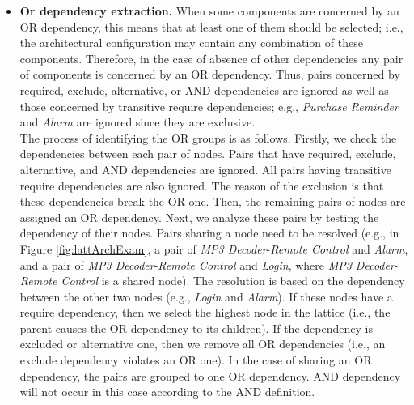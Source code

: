 \documentclass[graybox]{svmult}
\begin{document}
\begin{itemize}
\item \textbf{Or dependency extraction.}  {When some components are concerned by an OR dependency, this means that at least one of them should be selected; i.e., the architectural configuration may contain any combination of these components. Therefore, in the case of absence of other dependencies any pair of components is concerned by an OR dependency. Thus, pairs concerned by required, exclude, alternative, or AND dependencies are ignored as well as those concerned by transitive require dependencies; e.g., \textit{Purchase Reminder} and \textit{Alarm} are ignored since they are exclusive.\\
The process of identifying the OR groups is as follows. Firstly, we check the dependencies between each pair of nodes. Pairs that have required, exclude, alternative, and AND dependencies are ignored. All pairs having transitive require dependencies are also ignored. The reason of the exclusion is that these dependencies break the OR one. Then, the remaining pairs of nodes are assigned an OR dependency. Next, we analyze these pairs by testing the dependency of their nodes. Pairs sharing a node need to be resolved (e.g., in Figure \ref{fig:lattArchExam}, a pair of \textit{MP3 Decoder}-\textit{Remote Control} and \textit{Alarm}, and a pair of \textit{MP3 Decoder}-\textit{Remote Control} and \textit{Login}, where \textit{MP3 Decoder}-\textit{Remote Control} is a shared node). The resolution is based on the dependency between the other two nodes (e.g., \textit{Login} and \textit{Alarm}). If these nodes have a require dependency, then we select the highest node in the lattice (i.e., the parent causes the OR dependency to its children). If the dependency is excluded or alternative one, then we remove all OR dependencies (i.e., an exclude dependency violates an OR one). In the case of sharing an OR dependency, the pairs are grouped to one OR dependency. AND dependency will not occur in this case according to the AND definition.}


\end{itemize}
\end{document}
